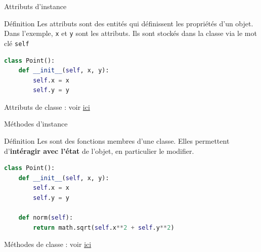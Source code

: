 \documentclass[10pt]{beamer}
\begin{document}
\begin{frame}[fragile]{Attributs d'instance}

  \begin{block}{Définition}
    \medskip
    Les attributs sont des entités qui définissent les propriétés d'un objet. Dans l'exemple, \texttt{x} et \texttt{y} sont les attributs. Ils sont stockés dans la classe via le mot clé \texttt{self}
  \end{block}

\begin{lstlisting}[language=Python, numbers=none]
class Point():
    def __init__(self, x, y):
        self.x = x
        self.y = y
\end{lstlisting}

\begin{center}
\end{center}

Attributs de classe : voir \href{https://docs.python.org/3/tutorial/classes.html#class-and-instance-variables}{ici}

\end{frame}









\begin{frame}[fragile]{Méthodes d'instance}

  \begin{block}{Définition}
    \medskip
    Les sont des fonctions membres d'une classe. Elles permettent d'\textbf{intéragir avec l'état} de l'objet, en particulier le modifier.

  \end{block}
\begin{lstlisting}[language=Python, numbers=none]
class Point():
    def __init__(self, x, y):
        self.x = x
        self.y = y

    def norm(self):
        return math.sqrt(self.x**2 + self.y**2)
\end{lstlisting}

Méthodes de classe : voir \href{https://www.geeksforgeeks.org/class-method-vs-static-method-python/}{ici}

\end{frame}
\end{document}
